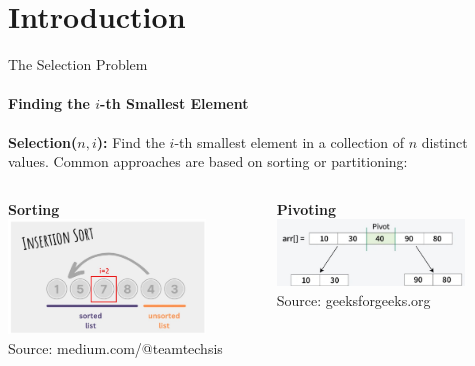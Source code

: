 
\author{SEA 2025 \hspace{1cm} Johanna Hofmann}
\section{Introduction}


\begin{frame}{The Selection Problem}
  \framesubtitle{Finding the $i$-th Smallest Element}
  \textbf{Selection($n,i$):} Find the $i$-th smallest element in a collection of $n$ distinct values.
  \vfill
  \centering
  Common approaches are based on sorting or partitioning:
  \begin{columns}[T]
    \begin{column}{0.45\textwidth}
      \centering
      \textbf{Sorting}\\
      \includegraphics[width=0.8\textwidth, trim={0 0 0 3.5cm}, clip]{figures/Insertion_sort.jpg}\\
      \tiny{Source: medium.com/@teamtechsis}
    \end{column}
    \begin{column}{0.45\textwidth}
      \centering
      \textbf{Pivoting}\\
      \includegraphics[width=0.8\textwidth]{figures/Pivot.jpg}\\
      \tiny{Source: geeksforgeeks.org}
    \end{column}
  \end{columns}


\end{frame}
